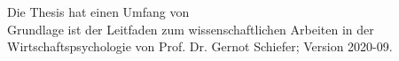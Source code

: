 \documentclass[a4paper, 11pt, ngerman]{scrartcl}
\begin{document}



 





\setcounter{page}{2}



{} 
\listoffigures
\newpage

{} 
\listoftables
\newpage




\tableofcontents

\vfill
Die Thesis hat einen Umfang von \\ 
Grundlage ist der Leitfaden zum wissenschaftlichen Arbeiten in der Wirtschaftspsychologie von Prof. Dr. Gernot Schiefer; Version 2020-09.
 
\newpage




\setlength{\parindent}{1.5cm}







\end{document}

